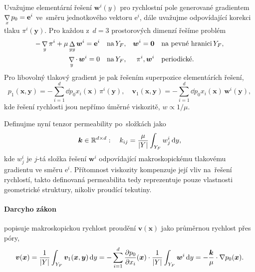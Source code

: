 Uvažujme elementární řešení $\bm{w}^i(y)$ pro rychlostní pole generované gradientem $\mathop{\nabla}\limits_{x} p_0=\bm{\mathrm{e}}^i$ ve~směru jednotkového vektoru $\bm{\mathrm{e}}^i$, dále uvažujme odpovídající korekci tlaku $\pi^i(\bm{y})$. Pro každou z~$d=3$ prostorových dimenzí řešíme problém
\begin{subequations}
\begin{align}
    -\mathop{\nabla}\limits_{y} \pi^{i} +\mu \mathop{\Delta}\limits_{yy} \bm{w}^{i}=\bm{\mathrm{e}}^i\quad\textrm{na}\,Y_F,&&\bm{w}^i=\bm{0}\quad&\textrm{na pevné hranici}\,Y_F,\\
    \mathop{\nabla}\limits_{y} \cdot\, \bm{w}^i=0\quad\textrm{na}\,Y_F,&&\pi^i,\bm{w}^i\quad&\textrm{periodické}.
\end{align}
\end{subequations}
Pro libovolný tlakový gradient je pak řešením superpozice elementárích řešení,
\begin{equation}
    p_1(\bm{x},\bm{y})=-\sum_{i=1}^{d}\dd{p_0}{x_i}(\bm{x})\,\pi^{i}(\bm{y}),\quad \bm{v}_1(\bm{x},\bm{y})=-\sum_{i=1}^{d}\dd{p_0}{x_i}(\bm{x})\,\bm{w}^{i}(\bm{y}),
\end{equation}
kde řešení rychlosti jsou nepřímo úměrné viskozitě, $w\propto1/\mu$.

Definujme nyní tenzor permeability  po~složkách jako
\begin{equation}
    \bm{k}\in\mathbb{R}^{d\times d}:\quad k_{ij}=\frac{\mu}{\left\lvert Y\right\rvert}\int_{Y_F} w_j^i\,\mathrm{d}{y},
\end{equation}
kde $w_j^i$ je $j$-tá složka řešení $\bm{w}^i$ odpovídající makroskopickému tlakovému gradientu ve směru $\bm{\mathrm{e}}^i$. Přítomnost viskozity kompenzuje její vliv na~řešení rychlostí, takto definovaná permeabilita tedy reprezentuje pouze vlastnosti geometrické struktury, nikoliv proudící tekutiny.

\paragraph{Darcyho zákon} popisuje makroskopickou rychlost proudění $\bm{v}(\bm{x})$ jako průměrnou rychlost přes póry,
\begin{equation}\label{eq:darcy_velocity}
    \bm{v}(\bm{x})=\frac{1}{\left\lvert Y\right\rvert}\int_{Y_F}\bm{v}_1(\bm{x},\bm{y})\,\mathrm{d}{y}=-\sum_{i=1}^{d}\frac{\partial p_0}{\partial x_i}(\bm{x})\cdot \frac{1}{\left\lvert Y\right\rvert}\int_{Y_F}\bm{w}^i\,\mathrm{d}{y}=-\frac{\bm{k}}{\mu}\cdot\nabla p_0(\bm{x}).
\end{equation}


